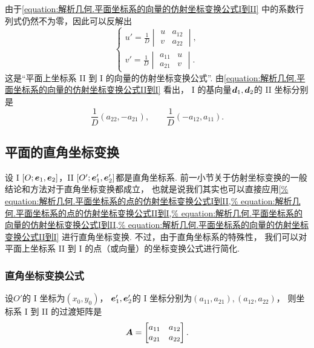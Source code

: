 由于\cref{equation:解析几何.平面坐标系的向量的仿射坐标变换公式I到II}
中的系数行列式仍然不为零，因此可以反解出
\begin{equation}\label{equation:解析几何.平面坐标系的向量的仿射坐标变换公式II到I}
	\left\{ \begin{array}{l}
		u' = \frac{1}{D} \begin{vmatrix}
			u & a_{12} \\
			v & a_{22}
		\end{vmatrix}, \\
		v' = \frac{1}{D} \begin{vmatrix}
			a_{11} & u \\
			a_{21} & v
		\end{vmatrix}.
	\end{array} \right.
\end{equation}
这是“平面上坐标系 II 到 I 的向量的仿射坐标变换公式”.
由\cref{equation:解析几何.平面坐标系的向量的仿射坐标变换公式II到I} 看出，
I 的基向量\(\boldsymbol{d}_1,\boldsymbol{d}_2\)的 II 坐标分别是\[
	\frac{1}{D} (a_{22},-a_{21}), \qquad
	\frac{1}{D} (-a_{12},a_{11}).
\]

\subsection{平面的直角坐标变换}
设 I \([O;\boldsymbol{e}_1,\boldsymbol{e}_2]\)，II \([O';\boldsymbol{e}_1',\boldsymbol{e}_2']\)都是直角坐标系.
前一小节关于仿射坐标变换的一般结论和方法对于直角坐标变换都成立，
也就是说我们其实也可以直接应用\cref{%
equation:解析几何.平面坐标系的点的仿射坐标变换公式I到II,%
equation:解析几何.平面坐标系的点的仿射坐标变换公式II到I,%
equation:解析几何.平面坐标系的向量的仿射坐标变换公式I到II,%
equation:解析几何.平面坐标系的向量的仿射坐标变换公式II到I}
进行直角坐标变换.
不过，由于直角坐标系的特殊性，
我们可以对平面上坐标系 II 到 I 的点（或向量）的坐标变换公式进行简化.

\subsubsection{直角坐标变换公式}
设\(O'\)的 I 坐标为\((x_0,y_0)\)，
\(\boldsymbol{e}_1',\boldsymbol{e}_2'\)的 I 坐标分别为\((a_{11},a_{21}),(a_{12},a_{22})\)，
则坐标系 I 到 II 的过渡矩阵是\[
	\boldsymbol{A} = \begin{bmatrix}
		a_{11} & a_{12} \\
		a_{21} & a_{22}
	\end{bmatrix}.
\]

